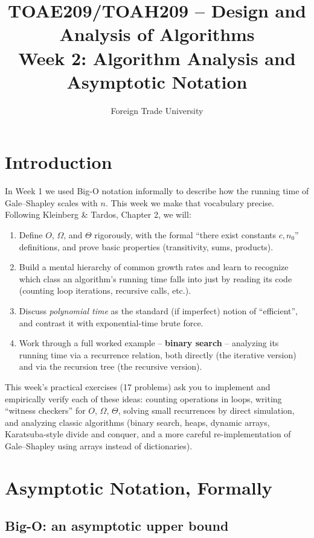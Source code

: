 \documentclass[11pt]{article}
\title{TOAE209/TOAH209 -- Design and Analysis of Algorithms\\[4pt]
\large Week 2: Algorithm Analysis and Asymptotic Notation}
\author{Foreign Trade University}
\date{}
\begin{document}
\maketitle
\tableofcontents

\section{Introduction}

In Week 1 we used Big-O notation informally to describe how the running time of
Gale--Shapley scales with $n$. This week we make that vocabulary precise. Following
Kleinberg \& Tardos, Chapter 2, we will:

\begin{enumerate}
    \item Define $O$, $\Omega$, and $\Theta$ rigorously, with the formal
    ``there exist constants $c, n_0$'' definitions, and prove basic properties (transitivity,
    sums, products).
    \item Build a mental hierarchy of common growth rates and learn to recognize which
    class an algorithm's running time falls into just by reading its code (counting loop
    iterations, recursive calls, etc.).
    \item Discuss \emph{polynomial time} as the standard (if imperfect) notion of
    ``efficient'', and contrast it with exponential-time brute force.
    \item Work through a full worked example -- \textbf{binary search} -- analyzing its
    running time via a recurrence relation, both directly (the iterative version) and via
    the recursion tree (the recursive version).
\end{enumerate}

This week's practical exercises (17 problems) ask you to implement and empirically verify
each of these ideas: counting operations in loops, writing ``witness checkers'' for $O$,
$\Omega$, $\Theta$, solving small recurrences by direct simulation, and analyzing classic
algorithms (binary search, heaps, dynamic arrays, Karatsuba-style divide and conquer, and a
more careful re-implementation of Gale--Shapley using arrays instead of dictionaries).

\section{Asymptotic Notation, Formally}

\subsection{Big-O: an asymptotic upper bound}
\end{document}
